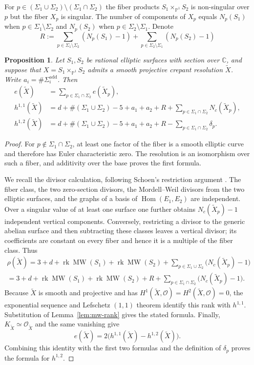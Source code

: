 \documentclass[a4paper]{amsart}
\theoremstyle{plain}
\newtheorem{Pro}[Thm]{Proposition}
\theoremstyle{definition}
\theoremstyle{remark}
\numberwithin{equation}{section}
\newcommand{\CC}{\mathbb{C}}
\newcommand{\PP}{\mathbb{P}}
\newcommand{\MW}{\operatorname{MW}}
\begin{document}
For $p\in (\Sigma_{1}\cup \Sigma_{2}) \setminus (\Sigma_{1}\cap \Sigma_{2})$ the fiber products $S_1\times_{\PP^1}S_2$ is non-singular over $p$ but the fiber $X_{p}$ is singular. The number of components of $X_{p}$ equals $N_{p}(S_{1})$ when $p\in\Sigma_{1}\setminus\Sigma_{2}$ and $N_{p}(S_{2})$ when $p\in\Sigma_{2}\setminus\Sigma_{1}$. Denote
\[R:=\sum_{p\in \Sigma_{1}\setminus \Sigma_{2}}(N_{p}(S_{1})-1) + \sum_{p\in \Sigma_{2}\setminus \Sigma_{1}}(N_{p}(S_{2})-1)\]
\begin{Pro}\label{prop:hodge}
Let $S_1,S_2$ be rational elliptic surfaces with section over $\CC$, and
suppose that $X=S_1\times_{\PP^1}S_2$ admits a \emph{smooth projective}
crepant resolution $\widetilde X$.  Write
$a_i=\#\Sigma_i^{\mathrm{add}}$.  Then
\begin{align*}
e(\widetilde X)
 &=\sum_{p\in\Sigma_1\cap\Sigma_2}e(\widetilde X_p),\\
h^{1,1}(\widetilde X)
 &=d+\#(\Sigma_1\cup\Sigma_2)-5+a_1+a_2 + R
   +\sum_{p\in\Sigma_1\cap\Sigma_2}N_c(\widetilde X_p),\\
h^{1,2}(\widetilde X)
 &=d+\#(\Sigma_1\cup\Sigma_2)-5+a_1+a_2 +R
   -\sum_{p\in\Sigma_1\cap\Sigma_2}\delta_p.
\end{align*}
\end{Pro}
\begin{proof}
For $p\notin\Sigma_1\cap\Sigma_2$, at least one factor of the fiber is a
smooth elliptic curve and therefore has Euler characteristic zero.  The
resolution is an isomorphism over such a fiber, and additivity over the
base proves the first formula.

We recall the divisor calculation, following Schoen's restriction
argument \cite[Section~3]{Schoen}.  The fiber class, the two zero-section
divisors, the Mordell--Weil divisors from the two elliptic surfaces, and
the graphs of a basis of $\operatorname{Hom}(E_1,E_2)$ are independent.
Over a singular value of at least one surface one further obtains $N_c(\widetilde X_p)-1$
independent vertical components.  Conversely, restricting a divisor to
the generic abelian surface and then subtracting these classes leaves a
vertical divisor; its coefficients are constant on every fiber and hence
it is a multiple of the fiber class.  Thus
\begin{align*}
\rho(\widetilde X)=3+d+\operatorname{rk}\MW(S_1)
+\operatorname{rk}\MW(S_2)
+\sum_{p\in\Sigma_1\cup\Sigma_2}\bigl(N_c(\widetilde X_p)-1\bigr)\\
=3+d+\operatorname{rk}\MW(S_1)
+\operatorname{rk}\MW(S_2) + R
+\sum_{p\in\Sigma_1\cap\Sigma_2}\bigl(N_c(\widetilde X_p)-1\bigr).
\end{align*}
Because $\widetilde X$ is smooth and projective and has
$H^1(\widetilde X,\mathcal O)=H^2(\widetilde X,\mathcal O)=0$, the
exponential sequence and Lefschetz $(1,1)$ theorem identify this rank with
$h^{1,1}$.  Substitution of Lemma~\ref{lem:mw-rank} gives the stated
formula.  Finally, $K_{\widetilde X}\simeq\mathcal O_{\widetilde X}$ and
the same vanishing give
\[
e(\widetilde X)=2\bigl(h^{1,1}(\widetilde X)-h^{1,2}(\widetilde X)\bigr).
\]
Combining this identity with the first two formulas and the definition of
$\delta_p$ proves the formula for $h^{1,2}$.
\end{proof}
\end{document}
